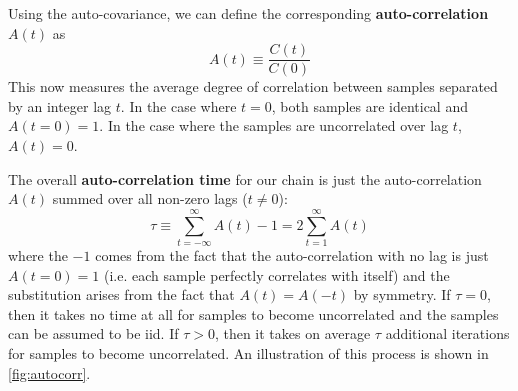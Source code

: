 \documentclass[12pt, titlepage]{article}
\begin{document}
Using the auto-covariance, we can define the corresponding
\textbf{auto-correlation} $A(t)$ as
\begin{equation}
    A(t) \equiv \frac{C(t)}{C(0)}
\end{equation}
This now measures the average degree of correlation between 
samples separated by an integer lag $t$. In the case where $t=0$,
both samples are identical and $A(t=0) = 1$. In the case
where the samples are uncorrelated over lag $t$,
$A(t) = 0$.

The overall \textbf{auto-correlation time}
for our chain is just the auto-correlation $A(t)$ summed over
all non-zero lags ($t \neq 0$):
\begin{equation}
    \tau \equiv \sum_{t=-\infty}^{\infty} A(t) - 1
    = 2 \sum_{t=1}^{\infty} A(t)
\end{equation}
where the $-1$ comes from the fact that
the auto-correlation with no lag is just $A(t=0) = 1$
(i.e. each sample perfectly correlates with itself) and
the substitution arises from the fact that $A(t) = A(-t)$ by symmetry.
If $\tau = 0$, then it takes
no time at all for samples to become uncorrelated and the
samples can be assumed to be iid. If $\tau > 0$, then
it takes on average $\tau$ additional iterations for
samples to become uncorrelated. 
An illustration of this process is shown in 
{\color{red} \autoref{fig:autocorr}}.
\end{document}
